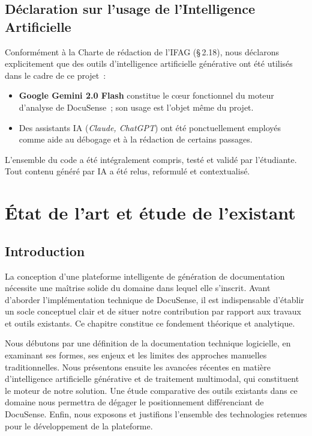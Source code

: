 \documentclass[12pt, a4paper, twoside, openany]{report}
\begin{document}
\section*{D\'eclaration sur l'usage de l'Intelligence Artificielle}

Conform\'ement \`a la Charte de r\'edaction de l'IFAG (\S\,2.18), nous d\'eclarons
explicitement que des outils d'intelligence artificielle g\'en\'erative ont \'et\'e
utilis\'es dans le cadre de ce projet~:

\begin{itemize}
  \item \textbf{Google Gemini 2.0 Flash} constitue le c\oe ur fonctionnel du moteur
        d'analyse de DocuSense~; son usage est l'objet m\^eme du projet.
  \item Des assistants IA (\textit{Claude, ChatGPT}) ont \'et\'e ponctuellement
        employ\'es comme aide au d\'ebogage et \`a la r\'edaction de certains passages.
\end{itemize}

L'ensemble du code a \'et\'e int\'egralement compris, test\'e et valid\'e par
l'\'etudiante. Tout contenu g\'en\'er\'e par IA a \'et\'e relus, reformul\'e et
contextualis\'e.

\chapter{\'Etat de l'art et \'etude de l'existant}

\section{Introduction}

La conception d'une plateforme intelligente de g\'en\'eration de documentation n\'ecessite
une ma\^itrise solide du domaine dans lequel elle s'inscrit. Avant d'aborder l'impl\'ementation
technique de DocuSense, il est indispensable d'\'etablir un socle conceptuel clair et de
situer notre contribution par rapport aux travaux et outils existants. Ce chapitre constitue
ce fondement th\'eorique et analytique.

Nous d\'ebutons par une d\'efinition de la documentation technique logicielle, en examinant
ses formes, ses enjeux et les limites des approches manuelles traditionnelles. Nous
pr\'esentons ensuite les avanc\'ees r\'ecentes en mati\`ere d'intelligence artificielle
g\'en\'erative et de traitement multimodal, qui constituent le moteur de notre solution.
Une \'etude comparative des outils existants dans ce domaine nous permettra de d\'egager
le positionnement diff\'erenciant de DocuSense. Enfin, nous exposons et justifions
l'ensemble des technologies retenues pour le d\'eveloppement de la plateforme.
\end{document}
